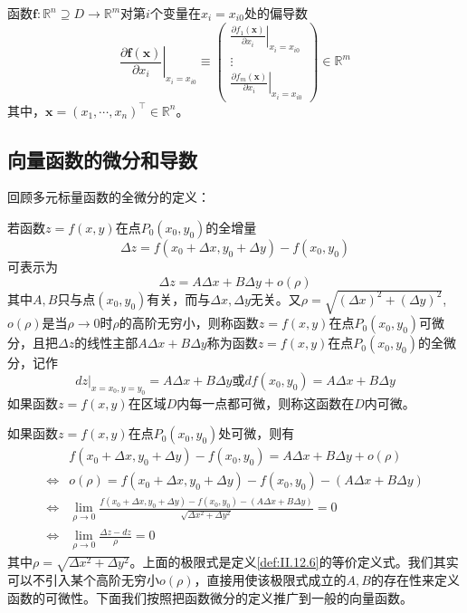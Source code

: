\documentclass[main.tex]{subfiles}
\begin{document}
\begin{definition}[向量函数的偏导数]
函数$\mathbf{f}:\mathbb{R}^n\supseteq D\rightarrow\mathbb{R}^m$对第$i$个变量在$x_i=x_{i0}$处的偏导数
\[
\left.\frac{\partial \mathbf{f}\left(\mathbf{x}\right)}{\partial x_i}\right|_{x_i=x_{i0}}\equiv\left(\begin{array}{c}
\left.\frac{\partial f_1\left(\mathbf{x}\right)}{\partial x_i}\right|_{x_i=x_{i0}}\\
\vdots\\
\left.\frac{\partial f_m\left(\mathbf{x}\right)}{\partial x_i}\right|_{x_i=x_{i0}}\end{array}\right)\in\mathbb{R}^m
\]
其中，$\mathbf{x}=\left(x_1,\cdots,x_n\right)^\intercal\in\mathbb{R}^n$。
\end{definition}


\subsection{向量函数的微分和导数}
回顾多元标量函数的全微分的定义\cite[“定义7.3.1”,p.~19]{华工高数2009下}：

\begin{definition}\label{def:II.12.6}
若函数$z=f\left(x,y\right)$在点$P_0\left(x_0,y_0\right)$的全增量
\[
\Delta z=f\left(x_0+\Delta x,y_0+\Delta y\right)-f\left(x_0,y_0\right)
\]
可表示为
\[
\Delta z=A \Delta x+ B \Delta y+o\left(\rho\right)
\]
其中$A,B$只与点$\left(x_0,y_0\right)$有关，而与$\Delta x,\Delta y$无关。又$\rho=\sqrt{\left(\Delta x\right)^2+\left(\Delta y\right)^2}$,$o\left(\rho\right)$是当$\rho\rightarrow 0$时$\rho$的高阶无穷小，则称函数$z=f\left(x,y\right)$在点$P_0\left(x_0,y_0\right)$可微分，且把$\Delta z$的线性主部$A\Delta x+B\Delta y$称为函数$z=f\left(x,y\right)$在点$P_0\left(x_0,y_0\right)$的全微分，记作
\[
\left.dz\right|_{x=x_0,y=y_0}=A\Delta x+B\Delta y\text{或}df\left(x_0,y_0\right)=A\Delta x+B\Delta y
\]
如果函数$z=f\left(x,y\right)$在区域$D$内每一点都可微，则称这函数在$D$内可微。
\end{definition}

如果函数$z=f\left(x,y\right)$在点$P_0\left(x_0,y_0\right)$处可微，则有
\begin{align*}
    &f\left(x_0+\Delta x,y_0+\Delta y\right)-f\left(x_0,y_0\right)=A\Delta x+B\Delta y+o\left(\rho\right)\\
    \Leftrightarrow&o\left(\rho\right)=f\left(x_0+\Delta x,y_0+\Delta y\right)-f\left(x_0,y_0\right)-\left(A\Delta x+B\Delta y\right)\\
    \Leftrightarrow&\lim_{\rho\to0}\frac{f\left(x_0+\Delta x,y_0+\Delta y\right)-f\left(x_0,y_0\right)-\left(A\Delta x+B\Delta y\right)}{\sqrt{\Delta x^2+\Delta y^2}}=0\\
    \Leftrightarrow&\lim_{\rho\to0}\frac{\Delta z-dz}{\rho}=0
\end{align*}
其中$\rho=\sqrt{\Delta x^2+\Delta y^2}$。上面的极限式是定义\ref{def:II.12.6}的等价定义式。我们其实可以不引入某个高阶无穷小$o\left(\rho\right)$，直接用使该极限式成立的$A,B$的存在性来定义函数的可微性。下面我们按照把函数微分的定义推广到一般的向量函数。
\end{document}

